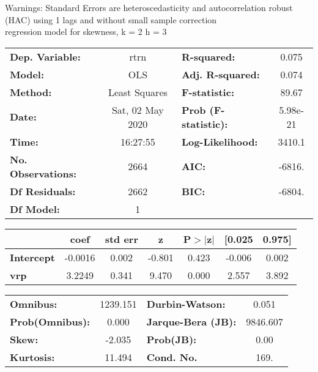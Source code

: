 Warnings: \newline
 [1] Standard Errors are heteroscedasticity and autocorrelation robust (HAC) using 1 lags and without small sample correction\\ 

regression model for skewness, k = 2 h = 3\begin{center}
\begin{tabular}{lclc}
\toprule
\textbf{Dep. Variable:}    &       rtrn       & \textbf{  R-squared:         } &     0.075   \\
\textbf{Model:}            &       OLS        & \textbf{  Adj. R-squared:    } &     0.074   \\
\textbf{Method:}           &  Least Squares   & \textbf{  F-statistic:       } &     89.67   \\
\textbf{Date:}             & Sat, 02 May 2020 & \textbf{  Prob (F-statistic):} &  5.98e-21   \\
\textbf{Time:}             &     16:27:55     & \textbf{  Log-Likelihood:    } &    3410.1   \\
\textbf{No. Observations:} &        2664      & \textbf{  AIC:               } &    -6816.   \\
\textbf{Df Residuals:}     &        2662      & \textbf{  BIC:               } &    -6804.   \\
\textbf{Df Model:}         &           1      & \textbf{                     } &             \\
\bottomrule
\end{tabular}
\begin{tabular}{lcccccc}
                   & \textbf{coef} & \textbf{std err} & \textbf{z} & \textbf{P$> |$z$|$} & \textbf{[0.025} & \textbf{0.975]}  \\
\midrule
\textbf{Intercept} &      -0.0016  &        0.002     &    -0.801  &         0.423        &       -0.006    &        0.002     \\
\textbf{vrp}       &       3.2249  &        0.341     &     9.470  &         0.000        &        2.557    &        3.892     \\
\bottomrule
\end{tabular}
\begin{tabular}{lclc}
\textbf{Omnibus:}       & 1239.151 & \textbf{  Durbin-Watson:     } &    0.051  \\
\textbf{Prob(Omnibus):} &   0.000  & \textbf{  Jarque-Bera (JB):  } & 9846.607  \\
\textbf{Skew:}          &  -2.035  & \textbf{  Prob(JB):          } &     0.00  \\
\textbf{Kurtosis:}      &  11.494  & \textbf{  Cond. No.          } &     169.  \\
\bottomrule
\end{tabular}
\end{center}

